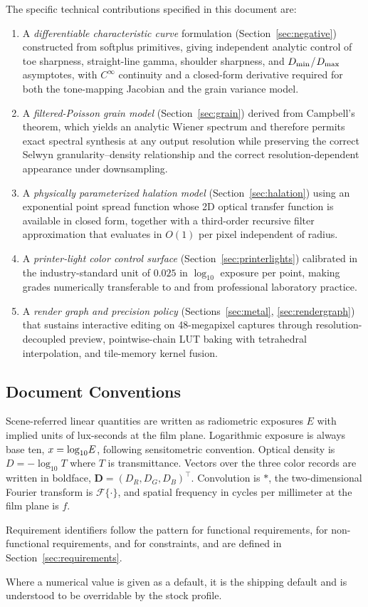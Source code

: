 The specific technical contributions specified in this document are:

\begin{enumerate}
\item A \emph{differentiable characteristic curve} formulation
(Section~\ref{sec:negative}) constructed from softplus primitives, giving
independent analytic control of toe sharpness, straight-line gamma, shoulder
sharpness, and $D_{\min}$/$D_{\max}$ asymptotes, with $C^\infty$ continuity and a
closed-form derivative required for both the tone-mapping Jacobian and the
grain variance model.
\item A \emph{filtered-Poisson grain model} (Section~\ref{sec:grain}) derived
from Campbell's theorem, which yields an analytic Wiener spectrum and therefore
permits exact spectral synthesis at any output resolution while preserving the
correct Selwyn granularity--density relationship and the correct
resolution-dependent appearance under downsampling.
\item A \emph{physically parameterized halation model}
(Section~\ref{sec:halation}) using an exponential point spread function whose
2D optical transfer function is available in closed form, together with a
third-order recursive filter approximation that evaluates in $O(1)$ per pixel
independent of radius.
\item A \emph{printer-light color control surface}
(Section~\ref{sec:printerlights}) calibrated in the industry-standard unit of
$0.025$ in $\log_{10}$ exposure per point, making \EM{} grades numerically
transferable to and from professional laboratory practice.
\item A \emph{render graph and precision policy} (Sections~\ref{sec:metal},
\ref{sec:rendergraph}) that sustains interactive editing on 48-megapixel
captures through resolution-decoupled preview, pointwise-chain LUT baking with
tetrahedral interpolation, and tile-memory kernel fusion.
\end{enumerate}

\subsection{Document Conventions}

Scene-referred linear quantities are written as radiometric exposures $E$ with
implied units of lux-seconds at the film plane. Logarithmic exposure is always
base ten, $x = \log_{10}\!E$, following sensitometric convention. Optical density is
$D = -\log_{10} T$ where $T$ is transmittance. Vectors over the three color
records are written in boldface, $\mathbf{D} = (D_R, D_G, D_B)^\top$.
Convolution is $*$, the two-dimensional Fourier transform is
$\mathcal{F}\{\cdot\}$, and spatial frequency in cycles per millimeter at the
film plane is $f$.

Requirement identifiers follow the pattern  for functional
requirements,  for non-functional requirements, and 
for constraints, and are defined in Section~\ref{sec:requirements}.

Where a numerical value is given as a default, it is the shipping default and
is understood to be overridable by the stock profile.
